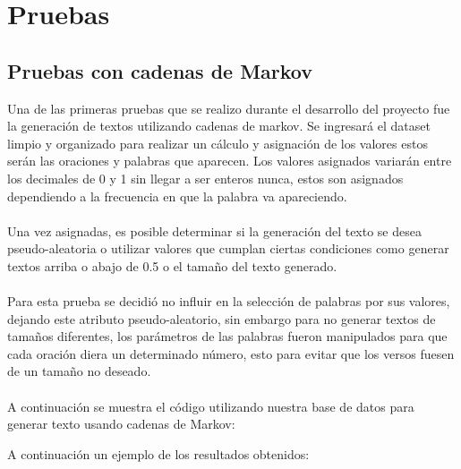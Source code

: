 \documentclass[12pt, a4paper, titlepage]{report}
\begin{document}
	   	\section{Pruebas}
	   	
	   	\subsection{Pruebas con cadenas de Markov}
	   	Una de las primeras pruebas que se realizo durante el desarrollo del proyecto fue la generación de textos utilizando cadenas de markov.
	   	Se ingresará el dataset limpio y organizado para realizar un cálculo y asignación de los valores estos serán las oraciones y palabras que aparecen.
	   	Los valores asignados variarán entre los decimales de 0 y 1 sin llegar a ser enteros nunca, estos son asignados dependiendo a la frecuencia en que la palabra va apareciendo.\\\\
	   	Una vez asignadas, es posible determinar si la generación del texto se desea pseudo-aleatoria o utilizar valores que cumplan ciertas condiciones como generar textos arriba o abajo de 0.5 o el tamaño del texto generado.\\\\
	   	Para esta prueba se decidió no influir en la selección de palabras por sus valores, dejando este atributo pseudo-aleatorio, sin embargo para no generar textos de tamaños diferentes, los parámetros de las palabras fueron manipulados para que cada oración diera un determinado número, esto para evitar que los versos fuesen de un tamaño no deseado.\\\\
	   	A continuación se muestra el código utilizando nuestra base de datos para generar texto usando cadenas de Markov:
	   	\begin{center}
	   		
	   	\end{center}
   	\newpage
	   	A continuación un ejemplo de los resultados obtenidos:
	   	\begin{center}
	   				
	   	\end{center}
   	
\end{document}
